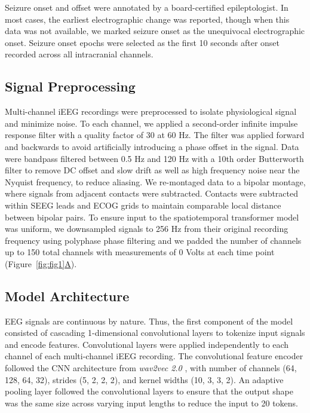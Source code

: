\documentclass[11pt]{article}
\begin{document}
Seizure onset and offset were annotated by a board-certified epileptologist. In most cases, the earliest electrographic change was reported, though when this data was not available, we marked seizure onset as the unequivocal electrographic onset\cite{Litt2001Epileptic}. Seizure onset epochs were selected as the first 10 seconds after onset recorded across all intracranial channels. 


\subsection*{Signal Preprocessing}
Multi-channel iEEG recordings were preprocessed to isolate physiological signal and minimize noise. To each channel, we applied a second-order infinite impulse response filter with a quality factor of 30 at 60 Hz. The filter was applied forward and backwards to avoid artificially introducing a phase offset in the signal. Data were bandpass filtered between 0.5 Hz and 120 Hz with a 10th order Butterworth filter to remove DC offset and slow drift as well as high frequency noise near the Nyquist frequency, to reduce aliasing. We re-montaged data to a bipolar montage, where signals from adjacent contacts were subtracted. Contacts were subtracted within SEEG leads and ECOG grids to maintain comparable local distance between bipolar pairs. To ensure input to the spatiotemporal transformer model was uniform, we downsampled signals to 256 Hz from their original recording frequency using polyphase phase filtering and we padded the number of channels up to 150 total channels with measurements of 0 Volts at each time point (Figure~\hyperref[fig:fig1]{\ref*{fig:fig1}A}).

\subsection*{Model Architecture}
EEG signals are continuous by nature. Thus, the first component of the model consisted of cascading 1-dimensional convolutional layers to tokenize input signals and encode features. Convolutional layers were applied independently to each channel of each multi-channel iEEG recording. The convolutional feature encoder followed the CNN architecture from \textit{wav2vec 2.0} \cite{baevski2020wav2vec20frameworkselfsupervised} , with number of channels (64, 128, 64, 32), strides (5, 2, 2, 2), and kernel widths (10, 3, 3, 2). An adaptive pooling layer followed the convolutional layers to ensure that the output shape was the same size across varying input lengths to reduce the input to 20 tokens.
\end{document}
